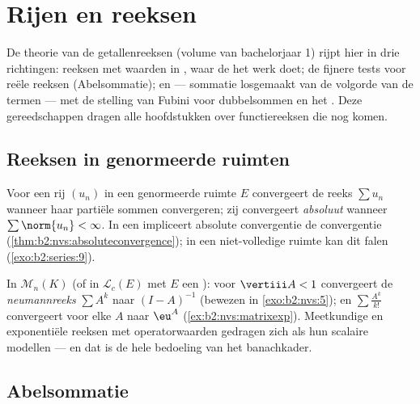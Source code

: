 \chapter{Rijen en reeksen}\label{ch:b2:series}

De theorie van de getallenreeksen (volume van bachelorjaar 1) rijpt
hier in drie richtingen: reeksen met waarden in , waar
de  het werk doet; de fijnere tests voor reële
reeksen (Abelsommatie); en \emph{} --- sommatie
losgemaakt van de volgorde van de termen --- met de stelling van
Fubini voor dubbelsommen en het . Deze gereedschappen
dragen alle hoofdstukken over functiereeksen die nog komen.

\section{Reeksen in genormeerde ruimten}

\begin{definition}\label{def:b2:series:def}
Voor een rij $(u_n)$ in een genormeerde ruimte $E$ convergeert de
reeks $\sum u_n$ wanneer haar partiële sommen convergeren; zij
convergeert \emph{absoluut} wanneer $\sum \norm{u_n} < \infty$. In een
\emph{} impliceert absolute convergentie de convergentie
(\cref{thm:b2:nvs:absoluteconvergence}); in een niet-volledige
ruimte kan dit falen (\cref{exo:b2:series:9}).
\end{definition}

\begin{example}\label{ex:b2:series:neumann}
In $\mathcal{M}_n(K)$ (of in $\mathcal{L}_c(E)$ met $E$ een
): voor $\vertiii A < 1$ convergeert de
\emph{neumannreeks} $\sum A^k$  naar $(I - A)^{-1}$
(bewezen in \cref{exo:b2:nvs:5}); en $\sum \frac{A^k}{k!}$
convergeert voor elke $A$  naar $\eu^A$
(\cref{ex:b2:nvs:matrixexp}). Meetkundige en exponentiële reeksen
met operatorwaarden gedragen zich als hun scalaire modellen --- en
dat is de hele bedoeling van het banachkader.
\end{example}

\section{Abelsommatie}

